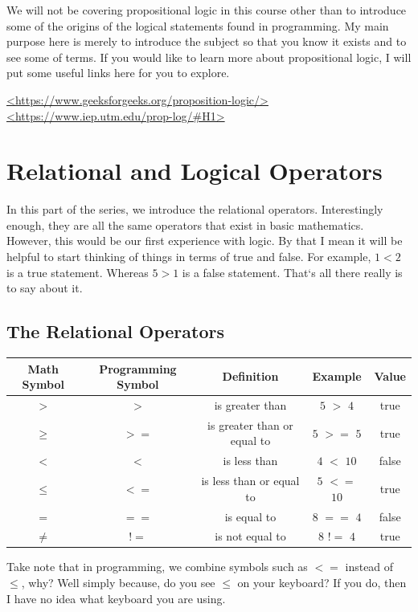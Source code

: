 \documentclass[11]{article}
\begin{document}
We will not be covering propositional logic in this course other than to introduce some of the origins of the logical statements found in programming. My main purpose here is merely to introduce the subject so that you know it exists and to see some of terms. If you would like to learn more about propositional logic, I will put some useful links here for you to explore.

\url{<https://www.geeksforgeeks.org/proposition-logic/>}\\
\url {<https://www.iep.utm.edu/prop-log/#H1>}


\section{Relational and Logical Operators}
In this part of the series, we introduce the relational operators.  Interestingly enough, they are all the same operators that exist in basic mathematics. However, this would be our first experience with logic. By that I mean it will be helpful to start thinking of things in terms of true and false. For example, $1<2$ is a true statement. Whereas $5>1$ is a false statement. That`s all there really is to say about it.
\subsection{The Relational Operators}
\begin{center}
  \begin{tabular}{ | c | c | c | c | c |}
    \hline
    Math Symbol & Programming Symbol & Definition & Example & Value \\ \hline
    $>$ & $>$ & is greater than & $5$ $>$ $4$ & true \\ \hline
    $\geq$ & $>=$ & is greater than or equal to & $5$ $>=$ $5$ & true \\ \hline
    $<$ & $<$ & is less than & $4$ $<$ $10$ & false \\ \hline
    $\leq$ & $<=$ & is less than or equal to & $5$ $<=$ $10$ & true \\ \hline
    $=$ & $==$ & is equal to & $8$ $==$  $4$ & false \\ \hline
    $\neq$ & $!=$ & is not equal to & $8$ $!=$  $4$ & true \\ 
    \hline
  \end{tabular}
\end{center}

Take note that in programming, we combine symbols such as $<=$ instead of $\leq$, why? Well simply because, do you see $\leq$ on your keyboard? If you do, then I have no idea what keyboard you are using. \\
\end{document}
